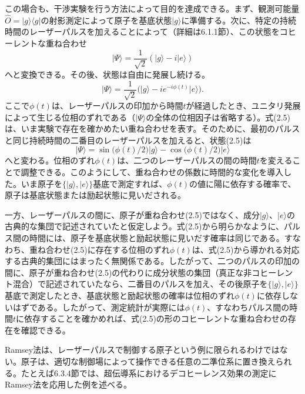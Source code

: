 この場合も、干渉実験を行う方法によって目的を達成できる。まず、観測可能量$\hat O=\lvert g\rangle\langle g\rvert$の射影測定によって原子を基底状態$\lvert g\rangle$に準備する。次に、特定の持続時間のレーザーパルスを加えることによって（詳細は6.1.1節）、この状態をコヒーレントな重ね合わせ
\hypertarget{srcpage:26}{}\label{srcpage:26}
\begin{equation}\lvert\Psi\rangle=\frac1{\sqrt2}(\lvert g\rangle-i\lvert e\rangle)\tag{2.4}\end{equation}
へと変換できる。その後、状態は自由に発展し続ける。
\begin{equation}\lvert\Psi\rangle=\frac1{\sqrt2}\bigl(\lvert g\rangle-ie^{-i\phi(t)}\lvert e\rangle\bigr).\tag{2.5}\end{equation}
ここで$\phi(t)$は、レーザーパルスの印加から時間$t$が経過したとき、ユニタリ発展によって生じる位相のずれである（$\lvert\Psi\rangle$の全体の位相因子は省略する）。式(2.5)は、いま実験で存在を確かめたい重ね合わせを表す。そのために、最初のパルスと同じ持続時間の二番目のレーザーパルスを加えると、状態(2.5)は
\begin{equation}\lvert\Psi\rangle=\sin\bigl(\phi(t)/2\bigr)\lvert g\rangle-\cos\bigl(\phi(t)/2\bigr)\lvert e\rangle\tag{2.6}\end{equation}
へと変わる。位相のずれ$\phi(t)$は、二つのレーザーパルスの間の時間$t$を変えることで調整できる。このようにして、重ね合わせの係数に時間的な変化を導入した。いま原子を$\{\lvert g\rangle,\lvert e\rangle\}$基底で測定すれば、$\phi(t)$の値に陽に依存する確率で、原子は基底状態または励起状態に見いだされる。

一方、レーザーパルスの間に、原子が重ね合わせ(2.5)ではなく、成分$\lvert g\rangle$、$\lvert e\rangle$の古典的な集団で記述されていたと仮定しよう。式(2.5)から明らかなように、パルス間の時間には、原子を基底状態と励起状態に見いだす確率は同じである。すなわち、重ね合わせ(2.5)に存在する位相のずれ$\phi(t)$は、式(2.5)から導かれる対応する古典的集団にはまったく無関係である。したがって、二つのパルスの印加の間に、原子が重ね合わせ(2.5)の代わりに成分状態の集団（真正な非コヒーレント混合）で記述されていたなら、二番目のパルスを加え、その後原子を$\{\lvert g\rangle,\lvert e\rangle\}$基底で測定したとき、基底状態と励起状態の確率は位相のずれ$\phi(t)$に依存しないはずである。したがって、測定統計が実際には$\phi(t)$、すなわちパルス間の時間$t$に依存することを確かめれば、式(2.5)の形のコヒーレントな重ね合わせの存在を確認できる。

Ramsey法は、レーザーパルスで制御する原子という例に限られるわけではない。原子は、適切な制御場によって操作できる任意の二準位系に置き換えられる。たとえば6.3.4節では、超伝導系におけるデコヒーレンス効果の測定にRamsey法を応用した例を述べる。

